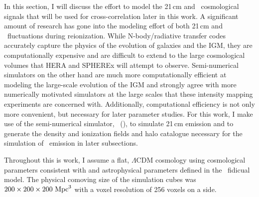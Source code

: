 In this section, I will discuss the effort to model the 21\,cm and \lya\
cosmological signals that will be used for cross-correlation later in this work.
A significant amount of research has gone into the modeling effort of both 21\,cm and
\lya\ fluctuations during reionization. While N-body/radiative
transfer codes accurately capture the physics of the evolution of
galaxies and the IGM, they are computationally
expensive and are difficult to extend to the large cosmological volumes that HERA and SPHEREx will
attempt to observe. Semi-numerical simulators on the other hand are much more
computationally efficient at modeling the large-scale evolution of the IGM and
strongly agree with more numerically motivated simulators at the large scales that
these intensity mapping experiments are concerned with.
Additionally, computational efficiency is not only more convenient, but necessary
for later parameter studies.
For this work, I make use of the semi-numerical
simulator, \fastsim\ (\cite{2011MNRAS.411..955M}),
to simulate 21\,cm emission and to generate the density and ionization fields and halo catalogue
necessary for the simulation of \lya\ emission in later subsections.

Throughout this is work, I assume a flat, $\Lambda$CDM cosmology using cosmological
parameters consistent with \cite{2016A&A...594A..13P} and astrophysical
parameters defined in the \fastsim\ fidicual model. The physical comoving size of the
simulation cubes was $200 \times 200 \times 200 \ {\rm Mpc}^3$ with a voxel resolution
of 256 voxels on a side.
